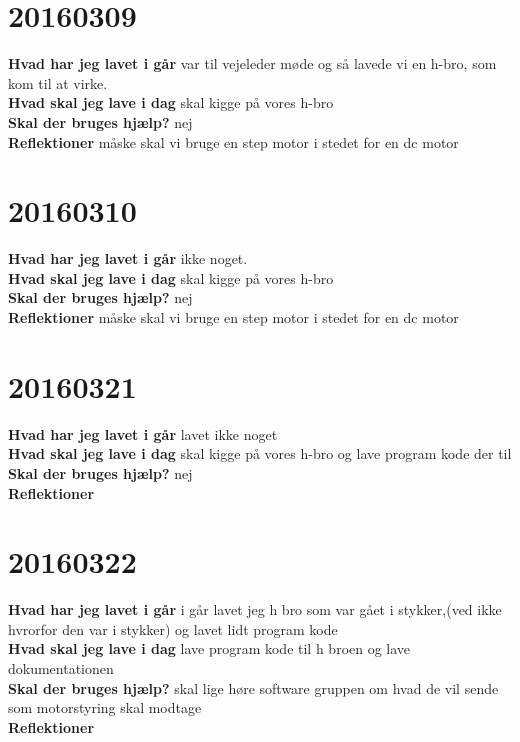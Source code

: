 \documentclass{article}
\begin{document}
				\section{20160309}
				
				\textbf{Hvad har jeg lavet i går}
				var til vejeleder møde og så lavede vi en h-bro, som kom til at virke.
				\\
				\textbf{Hvad skal jeg lave i dag}
				skal kigge på vores h-bro 
				\\
				\textbf{Skal der bruges hjælp?}
				nej
				\\
				\textbf{Reflektioner}
				måske skal vi bruge en step motor i stedet for en dc motor
				
				\section{20160310}
				
				\textbf{Hvad har jeg lavet i går}
				ikke noget.
				\\
				\textbf{Hvad skal jeg lave i dag}
				skal kigge på vores h-bro 
				\\
				\textbf{Skal der bruges hjælp?}
				nej
				\\
				\textbf{Reflektioner}
				måske skal vi bruge en step motor i stedet for en dc motor
				
				\section{20160321}
				
				\textbf{Hvad har jeg lavet i går}
				lavet ikke noget
				\\
				\textbf{Hvad skal jeg lave i dag}
				skal kigge på vores h-bro og lave program kode der til
				\\
				\textbf{Skal der bruges hjælp?}
				nej
				\\
				\textbf{Reflektioner}
				
			
				\section{20160322}
				
				\textbf{Hvad har jeg lavet i går}
				i går lavet jeg h bro som var gået i stykker,(ved ikke hvrorfor den var i stykker) og lavet lidt program kode
				\\
				\textbf{Hvad skal jeg lave i dag}
				 lave program kode til h broen og lave dokumentationen
				\\
				\textbf{Skal der bruges hjælp?}
				skal lige høre software gruppen om hvad de vil sende som motorstyring skal modtage
				\\
				\textbf{Reflektioner}
\end{document}
